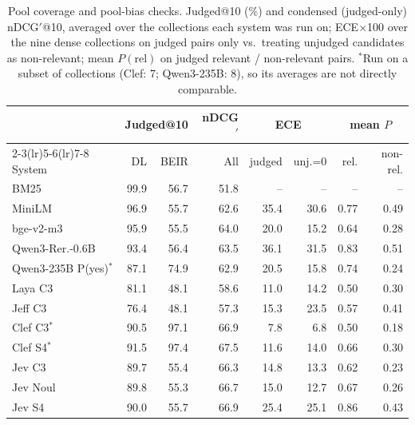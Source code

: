 \begin{table}[tp]
\centering
\scriptsize
\setlength{\tabcolsep}{2.5pt}
\caption{Pool coverage and pool-bias checks. Judged@10 (\%) and condensed (judged-only) nDCG$'$@10, averaged over the collections each system was run on; ECE$\times$100 over the nine dense collections on judged pairs only vs.\ treating unjudged candidates as non-relevant; mean $P(\text{rel})$ on judged relevant / non-relevant pairs. $^\ast$Run on a subset of collections (Clef: 7; Qwen3-235B: 8), so its averages are not directly comparable.}
\label{tab:judged}
\begin{tabular}{lrrrrrrr}
\toprule
 & \multicolumn{2}{c}{Judged@10} & nDCG$'$ & \multicolumn{2}{c}{ECE} & \multicolumn{2}{c}{mean $P$} \\
\cmidrule(lr){2-3}\cmidrule(lr){5-6}\cmidrule(lr){7-8}
System & DL & BEIR & All & judged & unj.=0 & rel. & non-rel. \\
\midrule
BM25 & 99.9 & 56.7 & 51.8 & -- & -- & -- & -- \\
MiniLM & 96.9 & 55.7 & 62.6 & 35.4 & 30.6 & 0.77 & 0.49 \\
bge-v2-m3 & 95.9 & 55.5 & 64.0 & 20.0 & 15.2 & 0.64 & 0.28 \\
Qwen3-Rer.-0.6B & 93.4 & 56.4 & 63.5 & 36.1 & 31.5 & 0.83 & 0.51 \\
Qwen3-235B P(yes)$^\ast$ & 87.1 & 74.9 & 62.9 & 20.5 & 15.8 & 0.74 & 0.24 \\
Laya C3 & 81.1 & 48.1 & 58.6 & 11.0 & 14.2 & 0.50 & 0.30 \\
Jeff C3 & 76.4 & 48.1 & 57.3 & 15.3 & 23.5 & 0.57 & 0.41 \\
Clef C3$^\ast$ & 90.5 & 97.1 & 66.9 & 7.8 & 6.8 & 0.50 & 0.18 \\
Clef S4$^\ast$ & 91.5 & 97.4 & 67.5 & 11.6 & 14.0 & 0.66 & 0.30 \\
Jev C3 & 89.7 & 55.4 & 66.3 & 14.8 & 13.3 & 0.62 & 0.23 \\
Jev Noul & 89.8 & 55.3 & 66.7 & 15.0 & 12.7 & 0.67 & 0.26 \\
Jev S4 & 90.0 & 55.7 & 66.9 & 25.4 & 25.1 & 0.86 & 0.43 \\
\bottomrule
\end{tabular}
\end{table}